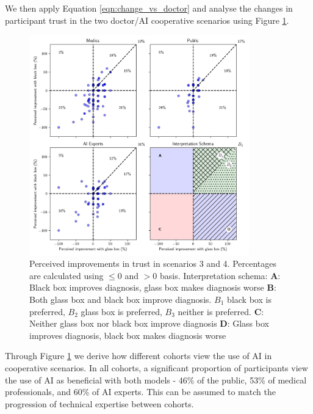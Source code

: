 \documentclass[manuscript,screen,review]{acmart}
\begin{document}
We then apply Equation \ref{eqn:change_vs_doctor} and analyse the changes in participant trust in the two doctor/AI cooperative scenarios using Figure \ref{fig:improvement}.

\begin{figure}[h!]
    \centering
    \includegraphics[width=0.85\textwidth]{graphics/Doctor_improvements_cooperation_scatter.jpg}
    \caption{\centering Perceived improvements in trust in scenarios 3 and 4. Percentages are calculated using $\leq 0$ and $>0$ basis.\hspace{\textwidth} Interpretation schema: \textbf{A}: Black box improves diagnosis, glass box makes diagnosis worse \hspace{\textwidth} \textbf{B}: Both glass box and black box improve diagnosis. \textbf{$B_1$} black box is preferred, \textbf{$B_2$} glass box is preferred, $B_3$ neither is preferred. \textbf{C}: Neither glass box nor black box improve diagnosis \textbf{D}: Glass box improves diagnosis, black box makes diagnosis worse}
    \label{fig:improvement}
\end{figure}

Through Figure \ref{fig:improvement} we derive how different cohorts view the use of AI in cooperative scenarios. In all cohorts, a significant proportion of participants view the use of AI as beneficial with both models - 46\% of the public, 53\% of medical professionals, and 60\% of AI experts. This can be assumed to match the progression of technical expertise between cohorts.
\end{document}
